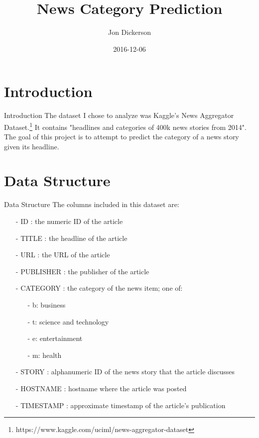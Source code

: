\documentclass[11pt]{beamer}
\author{Jon Dickerson}
\title{News Category Prediction}
\institute{Stevens Institute of Technology}
\date{2016-12-06}
\begin{document}
\begin{frame}
\titlepage
\end{frame}

\begin{frame}
\tableofcontents
\end{frame}

\section{Introduction}
\begin{frame}{Introduction}
	The dataset I chose to analyze was Kaggle's News Aggregator Dataset.\footnote{https://www.kaggle.com/uciml/news-aggregator-dataset} It contains "headlines and categories of 400k news stories from 2014". The goal of this project is to attempt to predict the category of a news story given its headline.
\end{frame}

\section{Data Structure}
\begin{frame}{Data Structure}
	The columns included in this dataset are:
	\begin{itemize}
		\item[-] ID : the numeric ID of the article
		\item[-] TITLE : the headline of the article
		\item[-] URL : the URL of the article
		\item[-] PUBLISHER : the publisher of the article
		\item[-] CATEGORY : the category of the news item; one of:
			\begin{itemize}
				\item[-] b: business
				\item[-] t: science and technology
				\item[-] e: entertainment
				\item[-] m: health
			\end{itemize}
		\item[-] STORY : alphanumeric ID of the news story that the article discusses
		\item[-] HOSTNAME : hostname where the article was posted
		\item[-] TIMESTAMP : approximate timestamp of the article's publication
	\end{itemize}
\end{frame}
\end{document}
